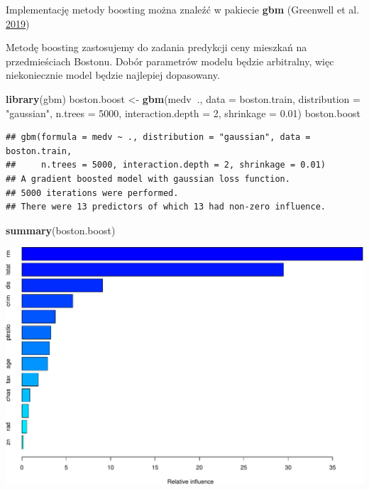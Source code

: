 \documentclass[]{book}
\newenvironment{Shaded}{\begin{snugshade}}{\end{snugshade}}
\newcommand{\DataTypeTok}[1]{\textcolor[rgb]{0.13,0.29,0.53}{#1}}
\newcommand{\DecValTok}[1]{\textcolor[rgb]{0.00,0.00,0.81}{#1}}
\newcommand{\FloatTok}[1]{\textcolor[rgb]{0.00,0.00,0.81}{#1}}
\newcommand{\KeywordTok}[1]{\textcolor[rgb]{0.13,0.29,0.53}{\textbf{#1}}}
\newcommand{\NormalTok}[1]{#1}
\newcommand{\OperatorTok}[1]{\textcolor[rgb]{0.81,0.36,0.00}{\textbf{#1}}}
\newcommand{\StringTok}[1]{\textcolor[rgb]{0.31,0.60,0.02}{#1}}
\theoremstyle{plain}
\theoremstyle{definition}
\theoremstyle{definition}
\theoremstyle{definition}
\theoremstyle{definition}
\theoremstyle{remark}
\let\BeginKnitrBlock\begin \let\EndKnitrBlock\end
\begin{document}
Implementację metody boosting można znaleźć w pakiecie \textbf{gbm} (Greenwell et al. \protect\hyperlink{ref-R-gbm}{2019})

\BeginKnitrBlock{example}
\protect\hypertarget{exm:przyk53}{}{\label{exm:przyk53} }Metodę boosting zastosujemy do zadania predykcji ceny mieszkań na przedmieściach Bostonu. Dobór parametrów modelu będzie arbitralny, więc niekoniecznie model będzie najlepiej dopasowany.
\EndKnitrBlock{example}

\begin{Shaded}
\begin{Highlighting}[]
\KeywordTok{library}\NormalTok{(gbm)}
\NormalTok{boston.boost <-}\StringTok{ }\KeywordTok{gbm}\NormalTok{(medv}\OperatorTok{~}\NormalTok{., }\DataTypeTok{data =}\NormalTok{ boston.train,}
                    \DataTypeTok{distribution =} \StringTok{"gaussian"}\NormalTok{, }
                    \DataTypeTok{n.trees =} \DecValTok{5000}\NormalTok{,}
                    \DataTypeTok{interaction.depth =} \DecValTok{2}\NormalTok{,}
                    \DataTypeTok{shrinkage =} \FloatTok{0.01}\NormalTok{)}
\NormalTok{boston.boost}
\end{Highlighting}
\end{Shaded}

\begin{verbatim}
## gbm(formula = medv ~ ., distribution = "gaussian", data = boston.train, 
##     n.trees = 5000, interaction.depth = 2, shrinkage = 0.01)
## A gradient boosted model with gaussian loss function.
## 5000 iterations were performed.
## There were 13 predictors of which 13 had non-zero influence.
\end{verbatim}

\begin{Shaded}
\begin{Highlighting}[]
\KeywordTok{summary}\NormalTok{(boston.boost)}
\end{Highlighting}
\end{Shaded}

\includegraphics{EksploracjaDanych_files/figure-latex/unnamed-chunk-43-1.pdf}
\end{document}
